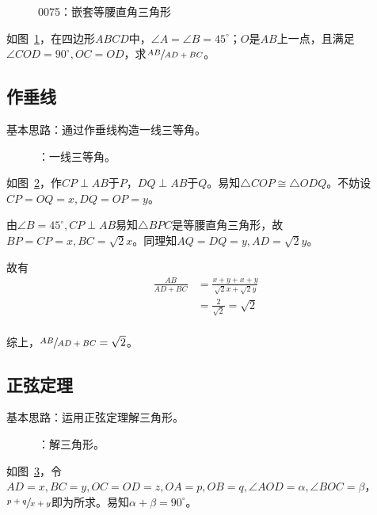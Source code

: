 

\begin{figure}[htbp]
  \centering
  \caption{0075：嵌套等腰直角三角形} \label{fig:0075}
\end{figure}

如图~\ref{fig:0075}，在四边形$ABCD$中，$\angle A = \angle B = 45^\circ$；$O$是$AB$上一点，且满足$\angle COD = 90^\circ, OC = OD$，求$\sfrac{AB}{AD + BC}$。


\subsection{作垂线} \label{subsec:0075-vert}

基本思路：通过作垂线构造一线三等角。

\begin{figure}[htbp]
  \centering
  \caption{：一线三等角。}
  \label{fig:0075-vert}
\end{figure}

如图~\ref{fig:0075-vert}，作$CP \perp AB$于$P$，$DQ \perp AB$于$Q$。易知$\triangle COP \cong \triangle ODQ$。不妨设$CP = OQ = x, DQ = OP = y$。

由$\angle B = 45^\circ, CP \perp AB$易知$\triangle BPC$是等腰直角三角形，故$BP = CP = x, BC = \sqrt2x$。同理知$AQ = DQ = y, AD = \sqrt2y$。

故有
\begin{align*}
  \frac{AB}{AD + BC} &= \frac{x + y + x + y}{\sqrt2x + \sqrt2y} \\
  &= \frac2{\sqrt2} = \sqrt2 \\
\end{align*}

综上，$\sfrac{AB}{AD + BC} = \sqrt2$。

\subsection{正弦定理} \label{subsec:0075-sin}

基本思路：运用正弦定理解三角形。

\begin{figure}[htbp]
  \centering
  \caption{：解三角形。}
  \label{fig:0075-sin}
\end{figure}

如图~\ref{fig:0075-sin}，令$AD = x, BC = y, OC = OD = z, OA = p, OB = q, \angle AOD = \alpha, \angle BOC = \beta$，$\sfrac{p + q}{x + y}$即为所求。易知$\alpha + \beta = 90^\circ$。

